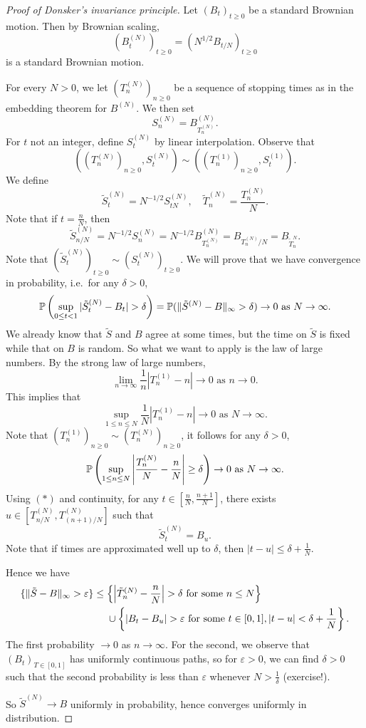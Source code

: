 \documentclass[a4paper]{article}
\begin{document}
\begin{proof}[Proof of Donsker's invariance principle]
  Let $(B_t)_{t \geq 0}$ be a standard Brownian motion. Then by Brownian scaling,
  \[
    (B_t^{(N)})_{t \geq 0} = (N^{1/2} B_{t/N})_{t \geq 0}
  \]
  is a standard Brownian motion.

  For every $N > 0$, we let $(T_n^{(N)})_{n \geq 0}$ be a sequence of stopping times as in the embedding theorem for $B^{(N)}$. We then set
  \[
    S_n^{(N)} = B_{T_n^{(N)}}^{(N)}.
  \]
  For $t$ not an integer, define $S_t^{(N)}$ by linear interpolation. Observe that
  \[
    ((T_n^{(N)})_{n \geq 0}, S_t^{(N)}) \sim ((T_n^{(1)})_{n \geq 0}, S_t^{(1)}).
  \]
  We define
  \[
    \tilde{S}_t^{(N)} = N^{-1/2} S_{tN}^{(N)},\quad \tilde{T}_n^{(N)} = \frac{T_n^{(N)}}{N}.
  \]
  Note that if $t = \frac{n}{N}$, then
  \[
    \tilde{S}^{(N)}_{n/N} = N^{-1/2} S_n^{(N)} = N^{-1/2} B_{T_n^{(N)}}^{(N)} = B_{T_n^{(N)}/N} = B_{\tilde{T}^N_n}.\tag{$*$}
  \]
  Note that $(\tilde{S}_t^{(N)})_{t \geq 0} \sim (S_t^{(N)})_{t \geq 0}$. We will prove that we have convergence in probability, i.e.\ for any $\delta > 0$,
  \[
    \P\left(\sup_{0\leq t < 1} |\tilde{S}_t^{(N)} - B_t| > \delta \right) = \P(\|\tilde{S}^{(N)} - B\|_\infty > \delta) \to 0 \text{ as }N \to \infty.
  \]
  We already know that $\tilde{S}$ and $B$ agree at some times, but the time on $\tilde{S}$ is fixed while that on $B$ is random. So what we want to apply is the law of large numbers. By the strong law of large numbers,
  \[
    \lim_{n \to \infty} \frac{1}{n} |T_n^{(1)} - n| \to 0\text{ as } n \to 0.
  \]
  This implies that
  \[
    \sup_{1 \leq n \leq N} \frac{1}{N} |T_n^{(1)} - n| \to 0\text{ as }N \to \infty.
  \]
  Note that $(T_n^{(1)})_{n \geq 0} \sim (T_n^{(N)})_{n \geq 0}$, it follows for any $\delta > 0$,
  \[
    \P\left(\sup_{1 \leq n \leq N} \left|\frac{T_n^{(N)}}{N} - \frac{n}{N} \right| \geq \delta\right) \to 0\text{ as }N \to \infty.
  \]
  Using $(*)$ and continuity, for any $t \in [\frac{n}{N}, \frac{n + 1}{N}]$, there exists $u \in [T^{(N)}_{n/N}, T^{(N)}_{(n+1)/N}]$ such that
  \[
    \tilde{S}^{(N)}_t = B_u.
  \]
  Note that if times are approximated well up to $\delta$, then $|t - u| \leq \delta + \frac{1}{N}$.

  Hence we have
  \begin{align*}
    \{\|\tilde{S} - B\|_{\infty} > \varepsilon\} &\leq \left\{ \left|\tilde{T}_n^{(N)} - \frac{n}{N}\right| > \delta\text{ for some }n \leq N\right\} \\
    &\phantomeq \cup \left\{|B_t - B_u| > \varepsilon \text{ for some }t \in [0, 1], |t - u| < \delta + \frac{1}{N}\right\}.
  \end{align*}
  The first probability $ \to 0$ as $n \to \infty$. For the second, we observe that $(B_t)_{T \in [0, 1]}$ has uniformly continuous paths, so for $\varepsilon > 0$, we can find $\delta > 0$ such that the second probability is less than $\varepsilon$ whenever $N > \frac{1}{\delta}$ (exercise!).

  So $\tilde{S}^{(N)} \to B$ uniformly in probability, hence converges uniformly in distribution.
\end{proof}
\end{document}
